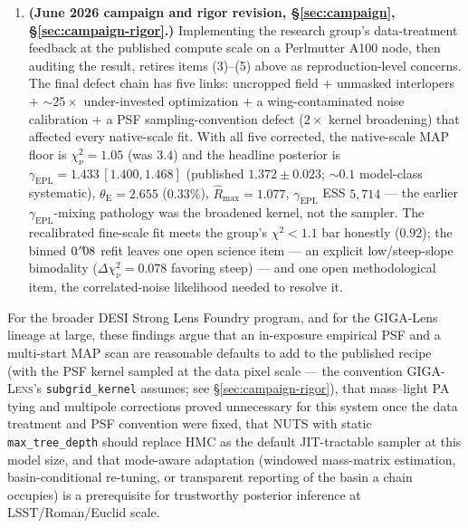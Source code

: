 \documentclass[11pt,letterpaper]{article}
\newcommand{\thetaE}{\ensuremath{\theta_{\mathrm{E}}}}
\newcommand{\gammaEPL}{\ensuremath{\gamma_{\mathrm{EPL}}}}
\newcommand{\gigalens}{\textsc{GIGA-Lens}}
\begin{document}
\begin{enumerate}
JAX\,0.6.2/TFP\,0.25.0 that would, if resolved, materially improve
the reproducibility of any Foundry-lineage analysis --- notably the
silent NaN from \texttt{jnp.linalg.cholesky} on a rank-deficient SVI
covariance, and the dual-averaging step-size pathology on
multimodal-Hessian models.
\item {\bf (June 2026 campaign and rigor revision,
\S\ref{sec:campaign}, \S\ref{sec:campaign-rigor}.)} Implementing the
research group's data-treatment feedback at the published compute scale
on a Perlmutter A100 node, then auditing the result, retires items
(3)--(5) above as reproduction-level concerns. The final defect chain
has five links: uncropped field $+$ unmasked interlopers $+$
$\sim$$25\times$ under-invested optimization $+$ a wing-contaminated
noise calibration $+$ a PSF sampling-convention defect ($2\times$
kernel broadening) that affected every native-scale fit. With all five
corrected, the native-scale MAP floor is $\chi^{2}_{\nu}=1.05$ (was
$3.4$) and the headline posterior is $\gammaEPL=1.433\,[1.400,1.468]$
(published $1.372\pm0.023$; $\sim$$0.1$ model-class systematic),
$\thetaE=2.655$ ($0.33\%$), $\hat R_{\max}=1.077$, $\gammaEPL$ ESS
$5{,}714$ --- the earlier $\gammaEPL$-mixing pathology was the
broadened kernel, not the sampler. The recalibrated fine-scale fit
meets the group's $\chi^{2}<1.1$ bar honestly ($0.92$); the binned
$0\mbox{$\!\!\,.{}^{\prime\prime}\!\!\,$}08$ refit leaves one open science item --- an explicit
low/steep-slope bimodality ($\Delta\chi^{2}_{\nu}=0.078$ favoring
steep) --- and one open methodological item, the correlated-noise
likelihood needed to resolve it.
\end{enumerate}

For the broader DESI Strong Lens Foundry program, and for the
GIGA-Lens lineage at large, these findings argue that an
in-exposure empirical PSF and a multi-start MAP scan are reasonable
defaults to add to the published recipe (with the PSF kernel sampled at
the data pixel scale --- the convention \gigalens's
\texttt{subgrid\_kernel} assumes; see \S\ref{sec:campaign-rigor}), that
mass--light PA tying and multipole corrections proved unnecessary for
this system once the data treatment and PSF convention were fixed, that
NUTS with static \texttt{max\_tree\_depth}
should replace HMC as the default JIT-tractable sampler at this model
size, and that mode-aware adaptation (windowed mass-matrix estimation,
basin-conditional re-tuning, or transparent reporting of the basin a
chain occupies) is a prerequisite for trustworthy posterior inference
at LSST/Roman/Euclid scale.
\end{document}
